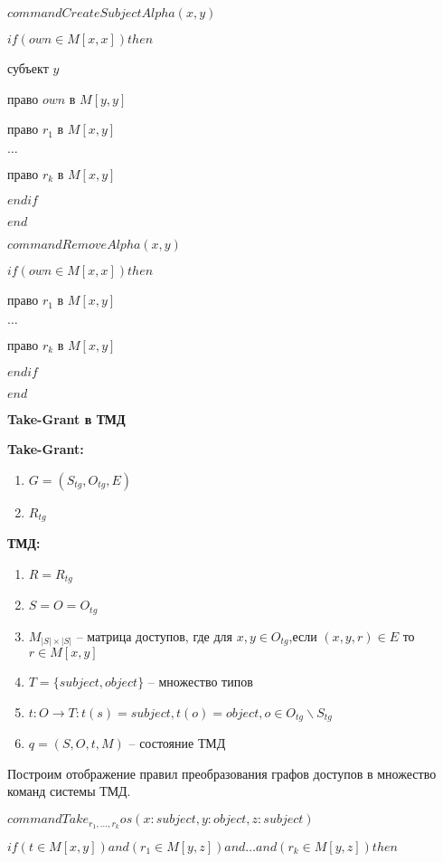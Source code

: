 		$command  CreateSubjectAlpha(x,y)$

		$if (own \in M[x,x]) then $
		
		 субъект $y$
		
		 право $own$ в $M[y,y]$

		 право $r_1$ в $M[x,y]$
		
		$\ldots$

		 право $r_k$ в $M[x,y]$

		$endif$

		$end$
		
		
		
		$command  RemoveAlpha(x,y)$

		$if (own \in M[x,x]) then $

		 право $r_1$ в $M[x,y]$
		
		$\ldots$

		 право $r_k$ в $M[x,y]$

		$endif$

		$end$

		
	\textbf{Take-Grant в ТМД} 
		
	\textbf{Take-Grant:} 
		
	\begin{enumerate}
		\item $G=(S_{tg}, O_{tg}, E)$
		\item $R_{tg}$
	\end{enumerate}
	
	\textbf{ТМД:} 
	
	\begin{enumerate}
		\item $R = R_{tg}$
		\item $S = O = O_{tg}$
		\item $M_{|S| \times |S|}$ -- матрица доступов, где для $x,y \in O_{tg}$,если $(x, y, r) \in E$ то $r \in M[x,y]$
		\item $T = \{subject, object\}$ -- множество типов
		\item $t: O \to T : t(s) = subject, t(o) = object, o \in O_{tg} \backslash S_{tg}$ 
		\item $q = (S, O, t, M)$ -- состояние ТМД
	\end{enumerate}
	
	
	Построим отображение правил преобразования графов доступов в множество команд системы ТМД.
	
	
		$command  Take_{r_1, \ldots, r_k}os(x: subject,y:object,z:subject)$

		$if (t \in M[x,y]) and (r_1 \in M[y,z])and  \ldots and (r_k \in M[y,z]) then $

